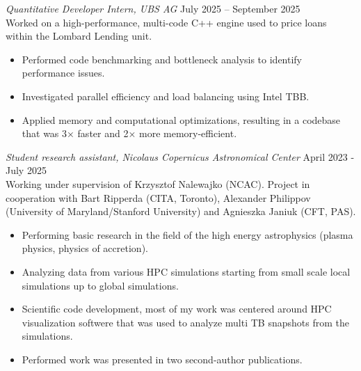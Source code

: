 \documentclass[margin, 10pt]{res} %
\begin{document}
\begin{resume}
{\sl Quantitative Developer Intern, UBS AG} \hfill July 2025 -- September 2025\\
Worked on a high-performance, multi-code C++ engine used to price loans within the Lombard Lending unit.
\begin{itemize}
    \item Performed code benchmarking and bottleneck analysis to identify performance issues.
    \item Investigated parallel efficiency and load balancing using Intel TBB.
    \item Applied memory and computational optimizations, resulting in a codebase that was 3× faster and 2× more memory-efficient.
\end{itemize}

{\sl Student research assistant, Nicolaus Copernicus Astronomical Center} \hfill April 2023 - July 2025\\
Working under supervision of Krzysztof Nalewajko (NCAC).
Project in cooperation with Bart Ripperda (CITA, Toronto), Alexander Philippov (University of Maryland/Stanford University) and Agnieszka Janiuk (CFT, PAS).
\begin{itemize}
    \item Performing basic research in the field of the high energy astrophysics (plasma physics, physics of accretion).
    \item Analyzing data from various HPC simulations starting from small scale local simulations up to global simulations.
    \item Scientific code development, most of my work was centered around HPC visualization softwere that was used to analyze multi TB snapshots
    from the simulations.
    \item Performed work was presented in two second-author publications.
\end{itemize}


\end{resume}
\end{document}
